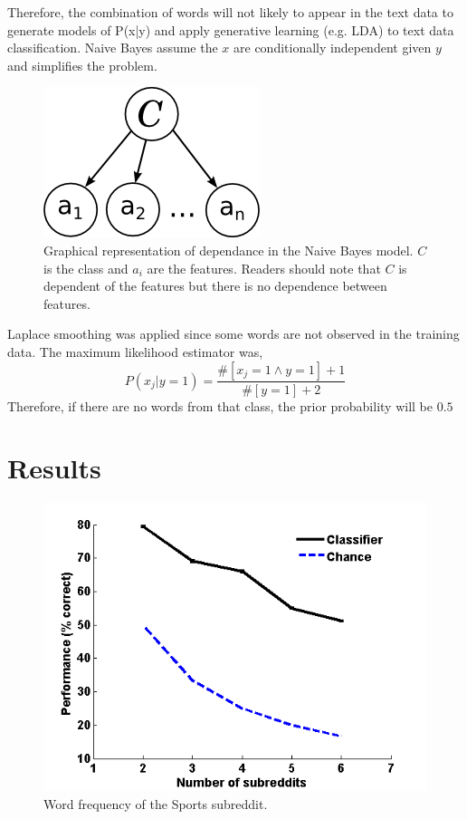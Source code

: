 \documentclass[10pt,twocolumn]{article}
\begin{document}
Therefore, the combination of words will not likely to appear in the text data to generate models of P(x|y) and apply generative learning (e.g. LDA) to text data classification.
Naive Bayes assume the $x$ are conditionally independent given $y$ and simplifies the problem.\autocite{jordan2002discriminative}

\begin{figure}
  	\includegraphics[scale=1.0]{./sysmag_bayes.png}
  	\caption{Graphical representation of dependance in the Naive Bayes model. $C$ is the class and $a_i$ are the features. Readers should note that $C$ is dependent of the features but there is no dependence between features. }
  	\label{fig:RSUencountered}
\end{figure}

Laplace smoothing was applied since some words are not observed in the training data. The maximum likelihood estimator was,
\[
P(x_j|y=1) = \frac {\#[x_j=1 \land y=1]+1}{\#[y=1]+2}
\]
Therefore, if there are no words from that class, the prior probability will be $0.5$

\section{Results}
		
\begin{figure}
    \centering
  	\includegraphics[scale=0.5]{./varyWBaseline.png}
  	\caption{Word frequency of the Sports subreddit.}
  	\label{fig:RSUencountered}
\end{figure}		
		
\end{document}

